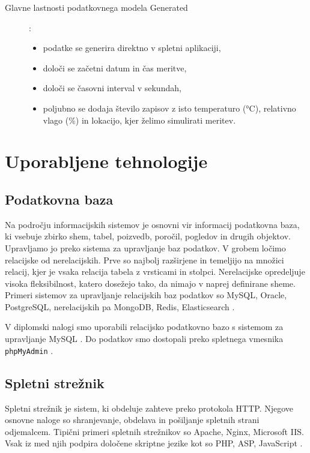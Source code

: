 \documentclass[a4paper, 12pt]{book}
\begin{document}
\begin{description}
\item[Glavne lastnosti podatkovnega modela Generated]:
\begin{itemize}
\item podatke se generira direktno v spletni aplikaciji,
\item določi se začetni datum in čas meritve,
\item določi se časovni interval v sekundah,
\item poljubno se dodaja število zapisov z isto temperaturo (°C), relativno vlago (\%) in lokacijo, kjer želimo simulirati meritev.
\end{itemize}
\end{description}

\chapter{Uporabljene tehnologije}
\label{uporabljene-tehnologije}



\section{Podatkovna baza}

Na področju informacijskih sistemov je osnovni vir informacij podatkovna baza, ki vsebuje zbirko shem, tabel, poizvedb, poročil, pogledov in drugih objektov. Upravljamo jo preko sistema za upravljanje baz podatkov. V grobem ločimo relacijske od nerelacijskih. Prve so najbolj razširjene in temeljijo na množici relacij, kjer je vsaka relacija tabela z vrsticami in stolpci. Nerelacijske opredeljuje visoka fleksibilnost, katero dosežejo tako, da nimajo v naprej definirane sheme.
Primeri sistemov za upravljanje relacijskih baz podatkov so MySQL, Oracle, PostgreSQL, nerelacijskih pa MongoDB, Redis, Elasticsearch \cite{podatkovne-baze}.

V diplomski nalogi smo uporabili relacijsko podatkovno bazo s sistemom za upravljanje MySQL \cite{mysql-baza}. Do podatkov smo dostopali preko spletnega vmesnika \verb=phpMyAdmin= \cite{phpmyadmin-framework}.

\section{Spletni strežnik}

Spletni strežnik je sistem, ki obdeluje zahteve preko protokola HTTP.
Njegove osnovne naloge so shranjevanje, obdelava in pošiljanje spletnih strani odjemalcem. Tipični primeri spletnih strežnikov so Apache, Nginx, Microsoft IIS. Vsak iz med njih podpira določene skriptne jezike kot so PHP, ASP, JavaScript \cite{spletni-strezniki}.
\end{document}
